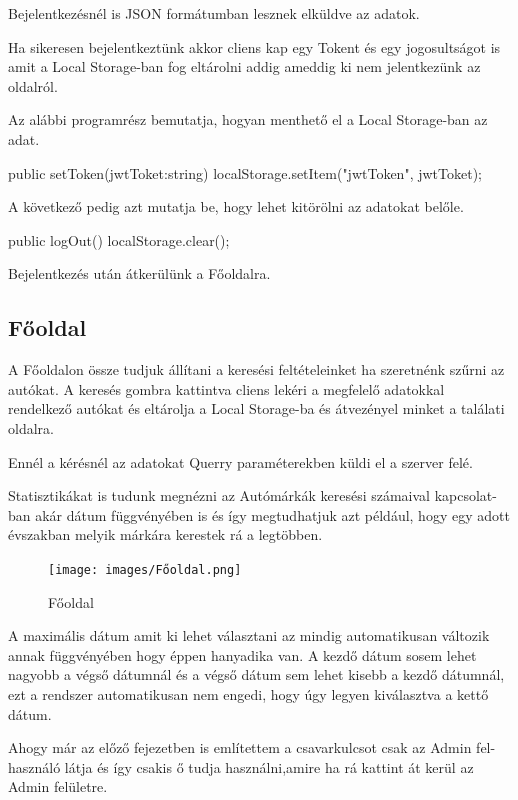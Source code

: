 Bejelentkezésnél is JSON formátumban lesznek elküldve az adatok.

Ha sikeresen bejelentkeztünk akkor cliens kap egy Tokent és egy jogosultságot is amit a Local Storage-ban fog eltárolni addig ameddig ki nem jelentkezünk az oldalról.

Az alábbi programrész bemutatja, hogyan menthető el a Local Storage-ban az adat.

\begin{java}
 public setToken(jwtToket:string){
    localStorage.setItem("jwtToken", jwtToket);
   }
\end{java}

A következő pedig azt mutatja be, hogy lehet kitörölni az adatokat belőle.

\begin{java}
    public logOut(){
    localStorage.clear();
   }
\end{java}

Bejelentkezés után átkerülünk a Főoldalra.

\subsection{Főoldal}

A Főoldalon össze tudjuk állítani a keresési feltételeinket ha szeretnénk szűrni az autókat.
A keresés gombra kattintva cliens lekéri a megfelelő adatokkal rendelkező autókat és eltárolja a Local Storage-ba és átvezényel minket a találati oldalra.

Ennél a kérésnél az adatokat Querry paraméterekben küldi el a szerver felé.

Statisztikákat is tudunk megnézni az Autómárkák keresési számaival kapcsolat-
ban akár dátum függvényében is és így megtudhatjuk azt például, hogy egy adott évszakban melyik márkára kerestek rá a legtöbben.

\begin{figure}[h]
\centering
\texttt{[image: images/Főoldal.png]}
\caption{Főoldal}
\label{fig:Főoldal}
\end{figure}

A maximális dátum amit ki lehet választani az mindig automatikusan változik annak függvényében hogy éppen hanyadika van.
A kezdő dátum sosem lehet nagyobb a végső dátumnál és a végső dátum sem lehet kisebb a kezdő dátumnál, ezt a rendszer automatikusan nem engedi, hogy úgy legyen kiválasztva a kettő dátum.

Ahogy már az előző fejezetben is említettem a csavarkulcsot csak az Admin fel-
használó látja és így csakis ő tudja használni,amire ha rá kattint át kerül az Admin felületre.

